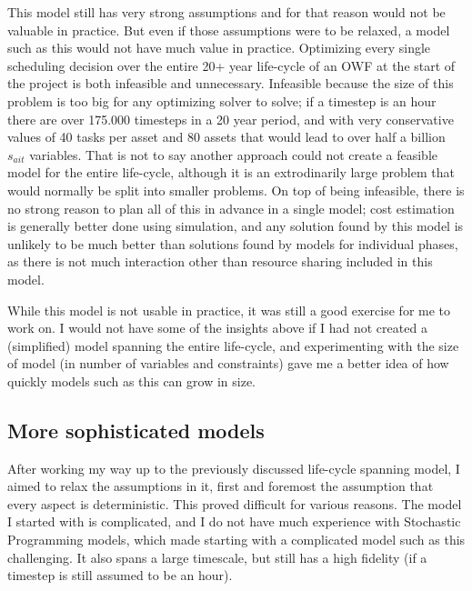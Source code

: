 \documentclass[a4paper,12pt]{article}
\begin{document}
This model still has very strong assumptions and for that reason would not be valuable in practice. But even if those assumptions were to be relaxed, a model such as this would not have much value in practice. Optimizing every single scheduling decision over the entire 20+ year life-cycle of an OWF at the start of the project is both infeasible and unnecessary. Infeasible because the size of this problem is too big for any optimizing solver to solve; if a timestep is an hour there are over 175.000 timesteps in a 20 year period, and with very conservative values of 40 tasks per asset and 80 assets that would lead to over half a billion $s_{ait}$ variables. That is not to say another approach could not create a feasible model for the entire life-cycle, although it is an extrodinarily large problem that would normally be split into smaller problems. On top of being infeasible, there is no strong reason to plan all of this in advance in a single model; cost estimation is generally better done using simulation, and any solution found by this model is unlikely to be much better than solutions found by models for individual phases, as there is not much interaction other than resource sharing included in this model. 

While this model is not usable in practice, it was still a good exercise for me to work on. I would not have some of the insights above if I had not created a (simplified) model spanning the entire life-cycle, and experimenting with the size of model (in number of variables and constraints) gave me a better idea of how quickly models such as this can grow in size. 

\subsection{More sophisticated models}
After working my way up to the previously discussed life-cycle spanning model, I aimed to relax the assumptions in it, first and foremost the assumption that every aspect is deterministic. This proved difficult for various reasons. The model I started with is complicated, and I do not have much experience with Stochastic Programming models, which made starting with a complicated model such as this challenging. It also spans a large timescale, but still has a high fidelity (if a timestep is still assumed to be an hour). 
\end{document}
